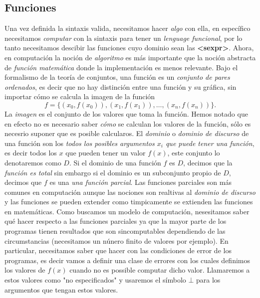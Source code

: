 \documentclass[11pt]{article}
\begin{document}
\subsection{Funciones}
\label{sec:org2b4093b}
Una vez definida la sintaxis valida, necesitamos hacer \emph{algo} con ella, en específico necesitamos \emph{computar} con la sintaxis para tener un \emph{lenguage funcional}, por lo tanto necesitamos descibir las funciones cuyo dominio sean las \textbf{<sexpr>}. Ahora, en computación la noción de \emph{algoritmo} es más importante que la noción abstracta de \emph{función matemática} donde la implementación es menos relevante. Bajo el formalismo de la teoría de conjuntos, una función es un \emph{conjunto de pares ordenados}, es decir que no hay distinción entre una función y su gráfica, sin importar cómo se calcula la imagen de la función
\[
f=\{(x_0,f(x_0)),(x_1,f(x_1)),\dots,(x_n,f(x_n))\}.
\]
La \emph{imagen} es el conjunto de los valores que toma la función. Hemos notado que en efecto no es necesario saber \emph{cómo} se calculan los valores de la función, sólo es necesrio suponer que es posible calcularos. El \emph{dominio} o \emph{dominio de discurso} de una función son los \emph{todos los posibles argumentos \(x_i\) que puede tener una función}, es decir todos los \(x\) que pueden tener un valor \(f(x)\), este conjunto lo denotaremos como \(D\). Si el dominio de una función \(f\) es \(D\), decimos que la \emph{función es total} sin embargo si el dominio es un subconjunto propio de \(D\), decimos que \(f\) es una \emph{una función parcial}. Las funciones parciales son más comunes en computación aunque  las nociones son realtivas al \emph{dominio de discurso} y las funciones se pueden extender como timpicamente se extienden las funciones en matemáticas.
Como buscamos un modelo de computación, nesesitamos saber qué hacer respecto a las funciones parciales ya que la mayor parte de los programas tienen resultados que son sincomputables dependiendo de las circumstancias (necesitamos un núnero finito de valores por ejemplo). En particular, necesitamos saber que hacer con las condiciones de error de los programas, es decir vamos a definir una clase de errores con los cuales definimos los  valores de \(f(x)\) cuando no es possible computar dicho valor. Llamaremos a estos valores como "no especificados" y usaremos el símbolo \(\bot\) para los argumentos que tengan estos valores.
\end{document}
